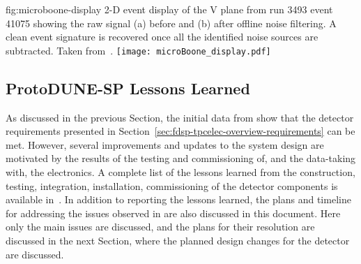\begin{dunefigure}
{fig:microboone-display}
{ 2-D event display of the V plane from run 3493 
event 41075 showing the raw signal (a) before and (b) after offline 
noise filtering. A clean event signature is recovered once all the 
identified noise sources are subtracted. Taken from~\cite{Acciarri:2017sde}.}
\texttt{[image: microBoone\_display.pdf]}
\end{dunefigure}

\subsection{ProtoDUNE-SP Lessons Learned}
\label{sec:fdsp-tpcelec-overview-lessons}

As discussed in the previous Section, the initial data from 
show that the  detector requirements presented in 
Section~\ref{sec:fdsp-tpcelec-overview-requirements} can be met.
However, several improvements and updates to the  system design 
are motivated by the results of the testing and commissioning of, and 
the data-taking with, the  electronics. A complete list
of the lessons learned from the construction, testing, integration,
installation, commissioning of the  detector components
is available in~\cite{bib:docdb12367}. In addition to reporting the
lessons learned, the plans and timeline for addressing the issues 
observed in  are also discussed in this document. Here
only the main issues are discussed, and the plans for their resolution
are discussed in the next Section, where the planned design changes
for the  detector are discussed.


